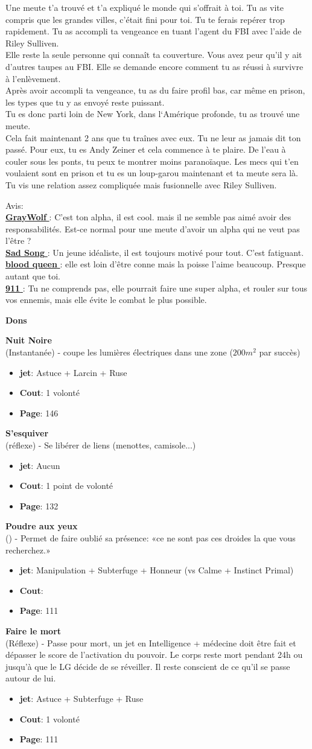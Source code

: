 \documentclass[oneside,12pt]{book}
\newcommand\don[6]{
\textbf{#1} \\
(#6) - #2
\begin{itemize}
\item{ \textbf{jet}: #3}
\item{ \textbf{Cout}: #4}
\item{ \textbf{Page}: #5}
\end{itemize}
\vspace{0.5cm}
}
\newcommand{\Glen}{\textbf{GrayWolf} }
\newcommand{\Mathew}{\textbf{Sad Song} }
\newcommand{\Laura}{\textbf{blood queen} }
\newcommand{\Kelly}{\textbf{911} }
\begin{document}
\begin{flushleft}
\begin{description}
{{ Une meute t'a trouvé et t'a expliqué le monde qui s'offrait à toi.
Tu as vite compris que les grandes villes, c'était fini pour toi. Tu te ferais repérer trop rapidement. Tu as accompli ta vengeance en tuant l'agent du FBI avec l'aide de Riley Sulliven.\\
Elle reste la seule personne qui connaît ta couverture. Vous avez peur qu'il y ait d'autres taupes au FBI. Elle se demande encore comment tu as réussi à survivre à l'enlèvement. \\
Après avoir accompli ta vengeance, tu as du faire profil bas, car même en prison, les types que tu y as envoyé reste puissant.\\ Tu es donc parti loin de New York, dans l`Amérique profonde, tu as trouvé une meute.\\
Cela fait maintenant 2 ans que tu traînes avec eux. Tu ne leur as jamais dit ton passé. Pour eux, tu es Andy Zeiner et cela commence à te plaire. De l'eau à couler sous les ponts, tu peux te montrer moins paranoïaque. Les mecs qui t'en voulaient sont en prison et tu es un loup-garou maintenant et ta meute sera là.\\
Tu vis une relation assez compliquée mais fusionnelle avec Riley Sulliven. }


Avis:\\
\underline{\Glen} :  C'est ton alpha, il est cool. mais il ne semble pas aimé avoir des responsabilités. Est-ce normal pour une meute d'avoir un alpha qui ne veut pas l'être ?\\
\underline{\Mathew} : Un jeune idéaliste, il est toujours motivé pour tout. C'est fatiguant.\\
\underline{\Laura} : elle est loin d'être conne mais la poisse l'aime beaucoup. Presque autant que toi. \\
\underline{\Kelly}: Tu ne comprends pas, elle pourrait faire une super alpha, et rouler sur tous vos ennemis, mais elle évite le combat le plus possible.\\
}
\end{description}
\clearpage
\textbf{\large Dons}
\vspace{0.5cm}

\don{Nuit Noire}{coupe les lumières électriques dans une zone (\begin{math}200m^2\end{math} par succès)}{Astuce + Larcin + Ruse}{1 volonté}{146}{Instantanée}
\don{S'esquiver}{Se libérer de liens (menottes, camisole...)}{Aucun}{1 point de volonté}{132}{réflexe}
\don{Poudre aux yeux}{Permet de faire oublié sa présence: «ce ne sont pas ces droides la que vous recherchez.»}{Manipulation + Subterfuge + Honneur (vs Calme + Instinct Primal)}{}{111}{}
\don{Faire le mort}{Passe pour mort, un jet en Intelligence + médecine doit être fait et dépasser le score de l'activation du pouvoir. Le corps reste mort pendant 24h ou jusqu'à que le LG décide de se réveiller. Il reste conscient de ce qu'il se passe autour de lui.}{Astuce + Subterfuge + Ruse}{1 volonté}{111}{Réflexe}


\end{flushleft}
\end{document}
